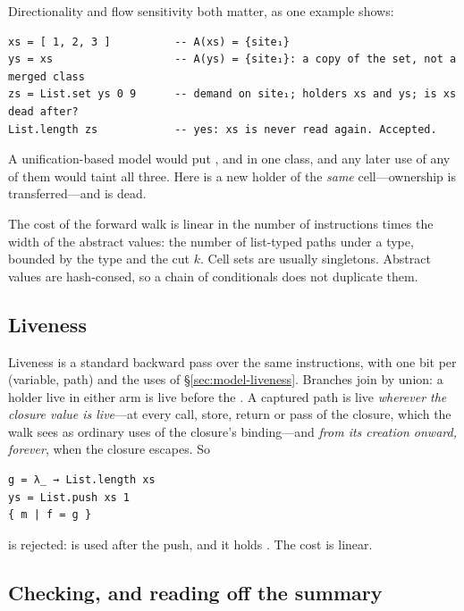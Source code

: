 Directionality and flow sensitivity both matter, as one example shows:
\begin{Verbatim}
xs = [ 1, 2, 3 ]          -- A(xs) = {site₁}
ys = xs                   -- A(ys) = {site₁}: a copy of the set, not a merged class
zs = List.set ys 0 9      -- demand on site₁; holders xs and ys; is xs dead after?
List.length zs            -- yes: xs is never read again. Accepted.
\end{Verbatim}
A unification-based model would put ,  and  in one class, and any later use
of any of them would taint all three. Here  is a new holder of the \emph{same} cell---ownership
is transferred---and  is dead.

The cost of the forward walk is linear in the number of instructions times the width of the
abstract values: the number of list-typed paths under a type, bounded by the type and the cut $k$.
Cell sets are usually singletons. Abstract values are hash-consed, so a chain of conditionals does
not duplicate them.

\subsection{Liveness}
\label{sec:inf-liveness}

Liveness is a standard backward pass over the same instructions, with one bit per (variable, path)
and the uses of \S\ref{sec:model-liveness}. Branches join by union: a holder live in either arm is
live before the . A captured path is live \emph{wherever the closure value is live}---at
every call, store, return or pass of the closure, which the walk sees as ordinary uses of the
closure's binding---and \emph{from its creation onward, forever}, when the closure escapes. So
\begin{Verbatim}
g = λ_ → List.length xs
ys = List.push xs 1
{ m | f = g }
\end{Verbatim}
is rejected:  is used after the push, and it holds . The cost is linear.

\subsection{Checking, and reading off the summary}
\label{sec:inf-summarise}

